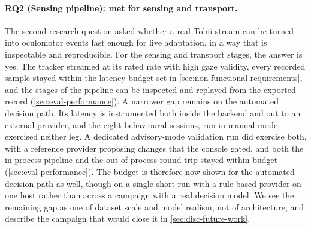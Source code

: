 \paragraph{RQ2 (Sensing pipeline): met for sensing and transport.}
The second research question asked whether a real Tobii stream can be turned into oculomotor events fast enough for live adaptation, in a way that is inspectable and reproducible.
For the sensing and transport stages, the answer is yes.
The tracker streamed at its rated rate with high gaze validity, every recorded sample stayed within the latency budget set in \cref{sec:non-functional-requirements}, and the stages of the pipeline can be inspected and replayed from the exported record (\cref{sec:eval-performance}).
A narrower gap remains on the automated decision path.
Its latency is instrumented both inside the backend and out to an external provider, and the eight behavioural sessions, run in manual mode, exercised neither leg.
A dedicated advisory-mode validation run did exercise both, with a reference provider proposing changes that the console gated, and both the in-process pipeline and the out-of-process round trip stayed within budget (\cref{sec:eval-performance}).
The budget is therefore now shown for the automated decision path as well, though on a single short run with a rule-based provider on one host rather than across a campaign with a real decision model.
We see the remaining gap as one of dataset scale and model realism, not of architecture, and describe the campaign that would close it in \cref{sec:disc-future-work}.

